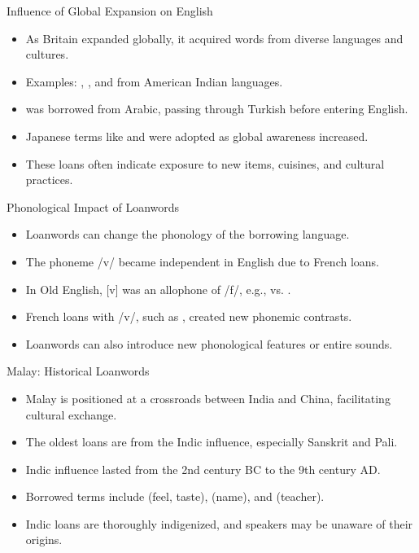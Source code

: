 \documentclass{beamer}
\newcommand{\msa}{\mtciteform}
\begin{document}
\begin{frame}{Influence of Global Expansion on English}
    \begin{itemize}
        \item As Britain expanded globally, it acquired words from diverse languages and cultures.
        \item Examples: , , and  from American Indian languages.
        \item {} was borrowed from Arabic, passing through Turkish before entering English.
        \item Japanese terms like  and  were adopted as global awareness increased.
        \item These loans often indicate exposure to new items, cuisines, and cultural practices.
    \end{itemize}
\end{frame}

\begin{frame}{Phonological Impact of Loanwords}
    \begin{itemize}
        \item Loanwords can change the phonology of the borrowing language.
        \item The phoneme /v/ became independent in English due to French loans.
        \item In Old English, [v] was an allophone of /f/, e.g.,  vs. .
        \item French loans with /v/, such as , created new phonemic contrasts.
        \item Loanwords can also introduce new phonological features or entire sounds.
    \end{itemize}
\end{frame}

\begin{frame}{Malay: Historical Loanwords}
    \begin{itemize}
        \item Malay is positioned at a crossroads between India and China, facilitating cultural exchange.
        \item The oldest loans are from the Indic influence, especially Sanskrit and Pali.
        \item Indic influence lasted from the 2nd century BC to the 9th century AD.
        \item Borrowed terms include \msa{rasa} (feel, taste), \msa{nama} (name), and \msa{guru} (teacher).
        \item Indic loans are thoroughly indigenized, and speakers may be unaware of their origins.
    \end{itemize}
\end{frame}
\end{document}
